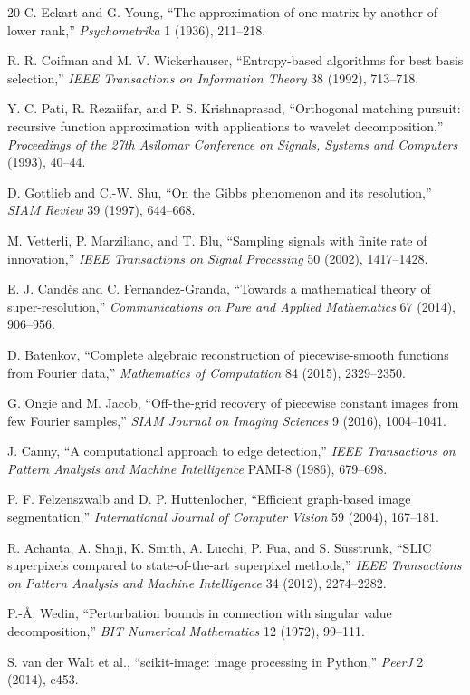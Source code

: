 \documentclass[11pt]{article}
\theoremstyle{definition}
\theoremstyle{remark}
\begin{document}
\clearpage
\begin{thebibliography}{20}
C. Eckart and G. Young,
``The approximation of one matrix by another of lower rank,''
\emph{Psychometrika} 1 (1936), 211--218.

R. R. Coifman and M. V. Wickerhauser,
``Entropy-based algorithms for best basis selection,''
\emph{IEEE Transactions on Information Theory} 38 (1992), 713--718.

Y. C. Pati, R. Rezaiifar, and P. S. Krishnaprasad,
``Orthogonal matching pursuit: recursive function approximation with applications to wavelet decomposition,''
\emph{Proceedings of the 27th Asilomar Conference on Signals, Systems and Computers} (1993), 40--44.

D. Gottlieb and C.-W. Shu,
``On the Gibbs phenomenon and its resolution,''
\emph{SIAM Review} 39 (1997), 644--668.

M. Vetterli, P. Marziliano, and T. Blu,
``Sampling signals with finite rate of innovation,''
\emph{IEEE Transactions on Signal Processing} 50 (2002), 1417--1428.

E. J. Cand\`es and C. Fernandez-Granda,
``Towards a mathematical theory of super-resolution,''
\emph{Communications on Pure and Applied Mathematics} 67 (2014), 906--956.

D. Batenkov,
``Complete algebraic reconstruction of piecewise-smooth functions from Fourier data,''
\emph{Mathematics of Computation} 84 (2015), 2329--2350.

G. Ongie and M. Jacob,
``Off-the-grid recovery of piecewise constant images from few Fourier samples,''
\emph{SIAM Journal on Imaging Sciences} 9 (2016), 1004--1041.

J. Canny,
``A computational approach to edge detection,''
\emph{IEEE Transactions on Pattern Analysis and Machine Intelligence} PAMI-8 (1986), 679--698.

P. F. Felzenszwalb and D. P. Huttenlocher,
``Efficient graph-based image segmentation,''
\emph{International Journal of Computer Vision} 59 (2004), 167--181.

R. Achanta, A. Shaji, K. Smith, A. Lucchi, P. Fua, and S. S\"usstrunk,
``SLIC superpixels compared to state-of-the-art superpixel methods,''
\emph{IEEE Transactions on Pattern Analysis and Machine Intelligence} 34 (2012), 2274--2282.

P.-\AA. Wedin,
``Perturbation bounds in connection with singular value decomposition,''
\emph{BIT Numerical Mathematics} 12 (1972), 99--111.

S. van der Walt et al.,
``scikit-image: image processing in Python,''
\emph{PeerJ} 2 (2014), e453.
\end{thebibliography}
\end{document}
